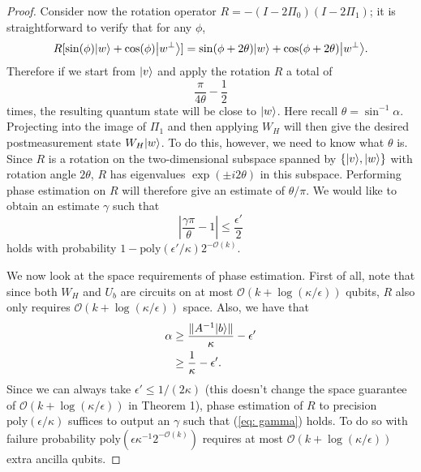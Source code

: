 \documentclass[11pt]{article}
\theoremstyle{definition}
\theoremstyle{remark}
\newcommand\bigoh{\mathcal{O}}
\newcommand{\poly}{\textrm{poly}}
\begin{document}
\begin{proof}
Consider now the rotation operator $R=-(I-2\Pi_0)(I-2\Pi_1)$; it is straightforward to verify that for any $\phi$,
\begin{equation}
R[\sin(\phi) {\left\vert{w}\right\rangle} + \cos(\phi) {\left\vert{w^\perp}\right\rangle}] = \sin(\phi + 2\theta) {\left\vert{w}\right\rangle} + \cos(\phi + 2\theta) {\left\vert{w^\perp}\right\rangle}.
\end{equation}
Therefore if we start from ${\left\vert{v}\right\rangle}$ and apply the rotation $R$ a total of
\begin{equation}
\frac{\pi}{4\theta} - \frac{1}{2}
\end{equation}
times, the resulting quantum state will be close to ${\left\vert{w}\right\rangle}$. Here recall $\theta = \sin^{-1}\alpha$. Projecting into the image of $\Pi_1$ and then applying $W_H$ will then give the desired postmeasurement state $W_H{\left\vert{w}\right\rangle}$. To do this, however, we need to know what $\theta$ is. Since $R$ is a rotation on the two-dimensional subspace spanned by $\{{\left\vert{v}\right\rangle},{\left\vert{w}\right\rangle}\}$ with rotation angle $2\theta$, $R$ has eigenvalues $\exp(\pm i2\theta)$ in this subspace. Performing phase estimation on $R$ will therefore give an estimate of $\theta/\pi$. We would like to obtain an estimate $\gamma$ such that 
\begin{equation} \label{eq: gamma}
\left|\frac{\gamma\pi}{\theta} - 1\right| \le  \frac{\epsilon'}{2}
\end{equation}
holds with probability $1-\poly(\epsilon' / \kappa)2^{-\mathcal{O}(k)}$.

We now look at the space requirements of phase estimation. First of all, note that since both $W_H$ and $U_b$ are circuits on at most $\bigoh (k + \log(\kappa/\epsilon))$ qubits, $R$ also only requires $\bigoh (k + \log(\kappa/\epsilon))$ space. Also, we have that
\begin{align}
\alpha &\ge \frac{\|A^{-1}{\left\vert{b}\right\rangle}\|}{\kappa} - \epsilon' \\
&\ge \frac{1}{\kappa} - \epsilon'.
\end{align}
Since we can always take $\epsilon' \le 1/(2\kappa)$ (this doesn't change the space guarantee of $\bigoh (k+\log(\kappa/\epsilon))$ in Theorem 1), phase estimation of $R$ to precision $\poly(\epsilon/\kappa)$ suffices to output an $\gamma$ such that (\ref{eq: gamma}) holds. To do so with failure probability $\poly(\epsilon \kappa^{-1}2^{-\mathcal{O}(k)})$ requires at most $\bigoh(k+\log(\kappa/\epsilon))$ extra ancilla qubits.


\end{proof}
\end{document}
